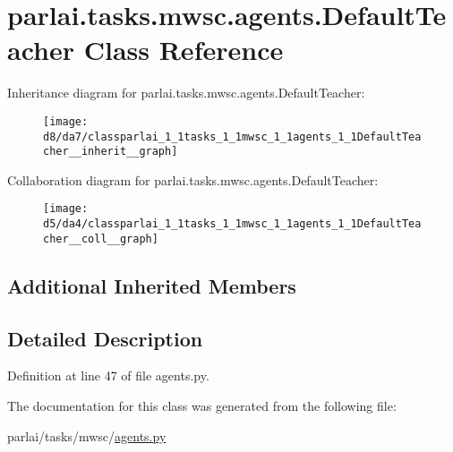 \hypertarget{classparlai_1_1tasks_1_1mwsc_1_1agents_1_1DefaultTeacher}{}\section{parlai.\+tasks.\+mwsc.\+agents.\+Default\+Teacher Class Reference}
\label{classparlai_1_1tasks_1_1mwsc_1_1agents_1_1DefaultTeacher}


Inheritance diagram for parlai.\+tasks.\+mwsc.\+agents.\+Default\+Teacher\+:\nopagebreak
\begin{figure}[H]
\begin{center}
\leavevmode
\texttt{[image: d8/da7/classparlai\_1\_1tasks\_1\_1mwsc\_1\_1agents\_1\_1DefaultTeacher\_\_inherit\_\_graph]}
\end{center}
\end{figure}


Collaboration diagram for parlai.\+tasks.\+mwsc.\+agents.\+Default\+Teacher\+:\nopagebreak
\begin{figure}[H]
\begin{center}
\leavevmode
\texttt{[image: d5/da4/classparlai\_1\_1tasks\_1\_1mwsc\_1\_1agents\_1\_1DefaultTeacher\_\_coll\_\_graph]}
\end{center}
\end{figure}
\subsection*{Additional Inherited Members}


\subsection{Detailed Description}


Definition at line 47 of file agents.\+py.



The documentation for this class was generated from the following file\+:\begin{DoxyCompactItemize}
\item 
parlai/tasks/mwsc/\hyperlink{parlai_2tasks_2mwsc_2agents_8py}{agents.\+py}\end{DoxyCompactItemize}
